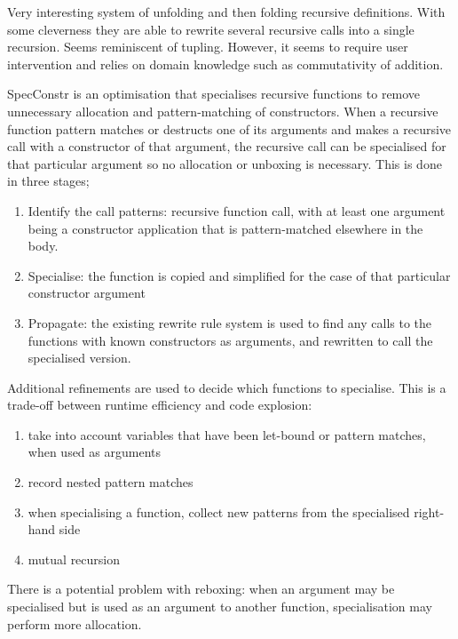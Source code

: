 

Very interesting system of unfolding and then folding recursive definitions.
With some cleverness they are able to rewrite several recursive calls into a single recursion.
Seems reminiscent of tupling.
However, it seems to require user intervention and relies on domain knowledge such as commutativity of addition.


SpecConstr is an optimisation that specialises recursive functions to remove unnecessary allocation and pattern-matching of constructors.
When a recursive function pattern matches or destructs one of its arguments and makes a recursive call with a constructor of that argument,
the recursive call can be specialised for that particular argument so no allocation or unboxing is necessary.
This is done in three stages;
\begin{enumerate}
\item
Identify the call patterns: recursive function call, with at least one argument being a constructor application that is pattern-matched elsewhere in the body.
\item
Specialise: the function is copied and simplified for the case of that particular constructor argument
\item
Propagate: the existing rewrite rule system is used to find any calls to the functions with known constructors as arguments, and rewritten to call the specialised version.
\end{enumerate}
Additional refinements are used to decide which functions to specialise. This is a trade-off between runtime efficiency and code explosion:
\begin{enumerate}
\item
 take into account variables that have been let-bound or pattern matches, when used as arguments
\item
 record nested pattern matches
\item
 when specialising a function, collect new patterns from the specialised right-hand side
\item
 mutual recursion
\end{enumerate}
There is a potential problem with reboxing: when an argument may be specialised but is used as an argument to another function, specialisation may perform more allocation.




